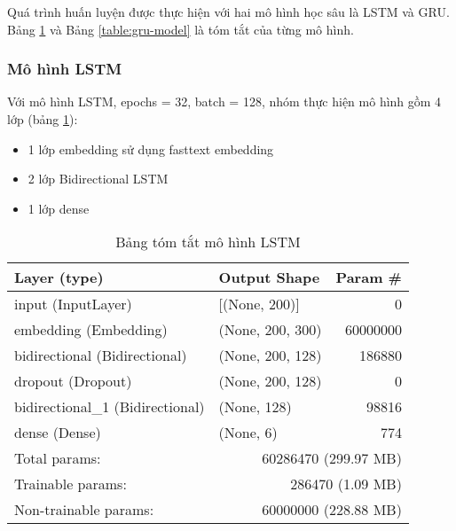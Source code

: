 Quá trình huấn luyện được thực hiện với hai mô hình học sâu là LSTM và GRU. Bảng \ref{table:lstm-model} và Bảng \ref{table:gru-model} là tóm tắt của từng mô hình.

\subsubsection{Mô hình LSTM}
Với mô hình LSTM, epochs = 32, batch = 128, nhóm thực hiện mô hình gồm 4 lớp (bảng \ref{table:lstm-model}):
\begin{itemize}
    \item 1 lớp embedding sử dụng fasttext embedding
    \item 2 lớp Bidirectional LSTM
    \item 1 lớp dense
\end{itemize}

\begin{table}[htb]
    \centering
    \caption{Bảng tóm tắt mô hình LSTM}\label{table:lstm-model}
    \begin{tabular}{l l r}
        \toprule
        \textbf{Layer (type)}            & \textbf{Output Shape}                    & \textbf{Param \#} \\\midrule
        input (InputLayer)               & [(None, 200)]                            & 0                 \\
        embedding (Embedding)            & (None, 200, 300)                         & 60000000          \\
        bidirectional (Bidirectional)    & (None, 200, 128)                         & 186880            \\
        dropout (Dropout)                & (None, 200, 128)                         & 0                 \\
        bidirectional\_1 (Bidirectional) & (None, 128)                              & 98816             \\
        dense (Dense)                    & (None, 6)                                & 774               \\\midrule
        Total params:                    & \multicolumn{2}{r}{60286470 (299.97 MB)}                     \\
        Trainable params:                & \multicolumn{2}{r}{286470 (1.09 MB)}                         \\
        Non-trainable params:            & \multicolumn{2}{r}{60000000 (228.88 MB)}                     \\
        \bottomrule
    \end{tabular}
\end{table}

